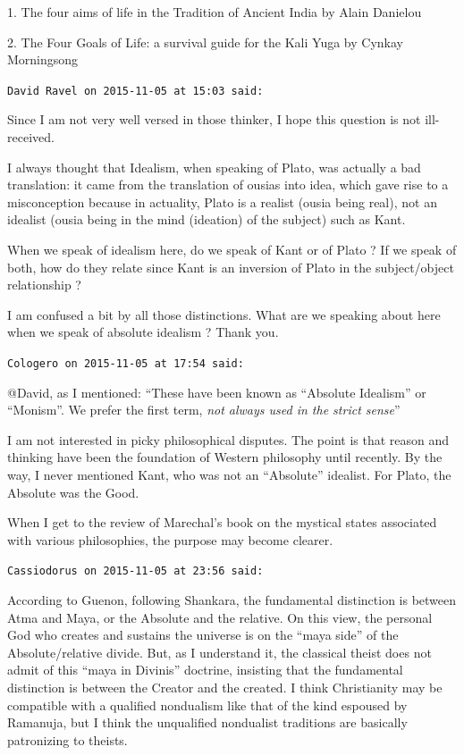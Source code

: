 \begin{footnotesize}
\begin{sffamily}
1. The four aims of life in the Tradition of Ancient India by Alain Danielou

2. The Four Goals of Life: a survival guide for the Kali Yuga by Cynkay Morningsong


\hfill

\texttt{David Ravel on 2015-11-05 at 15:03 said: }

Since I am not very well versed in those thinker, I hope this question is not ill-received. 

I always thought that Idealism, when speaking of Plato, was actually a bad translation: it came from the translation of
ousias into idea, which gave rise to a misconception because in actuality, Plato is a realist (ousia being real), not
an idealist (ousia being in the mind (ideation) of the subject) such as Kant. 

When we speak of idealism here, do we speak of Kant or of Plato ? If we speak of both, how do they relate since Kant is
an inversion of Plato in the subject/object relationship ? 

I am confused a bit by all those distinctions. What are we speaking about here when we speak of absolute idealism ?
Thank you.


\hfill

\texttt{Cologero on 2015-11-05 at 17:54 said: }

@David, as I mentioned: “These have been known as “Absolute Idealism” or “Monism”. We prefer the first term, \emph{not
always used in the strict sense}”

I am not interested in picky philosophical disputes. The point is that reason and thinking have been the foundation of
Western philosophy until recently. By the way, I never mentioned Kant, who was not an “Absolute” idealist. For Plato,
the Absolute was the Good.

When I get to the review of Marechal's book on the mystical states associated with various philosophies, the
purpose may become clearer.


\hfill

\texttt{Cassiodorus on 2015-11-05 at 23:56 said: }

According to Guenon, following Shankara, the fundamental distinction is between Atma and Maya, or the Absolute and the
relative. On this view, the personal God who creates and sustains the universe is on the “maya side” of the
Absolute/relative divide. But, as I understand it, the classical theist does not admit of this “maya in Divinis”
doctrine, insisting that the fundamental distinction is between the Creator and the created. I think Christianity may
be compatible with a qualified nondualism like that of the kind espoused by Ramanuja, but I think the unqualified
nondualist traditions are basically patronizing to theists.



\end{sffamily}
\end{footnotesize}
